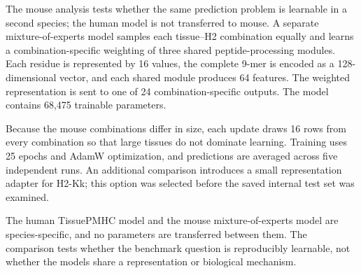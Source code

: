 The mouse analysis tests whether the same prediction problem is learnable in a second species; the human model is not transferred to mouse. A separate mixture-of-experts model samples each tissue--H2 combination equally and learns a combination-specific weighting of three shared peptide-processing modules. Each residue is represented by 16 values, the complete 9-mer is encoded as a 128-dimensional vector, and each shared module produces 64 features. The weighted representation is sent to one of 24 combination-specific outputs. The model contains 68,475 trainable parameters.

Because the mouse combinations differ in size, each update draws 16 rows from every combination so that large tissues do not dominate learning. Training uses 25 epochs and AdamW optimization, and predictions are averaged across five independent runs. An additional comparison introduces a small representation adapter for H2-Kk; this option was selected before the saved internal test set was examined.

The human TissuePMHC model and the mouse mixture-of-experts model are species-specific, and no parameters are transferred between them. The comparison tests whether the benchmark question is reproducibly learnable, not whether the models share a representation or biological mechanism.
